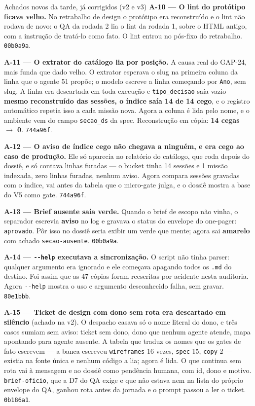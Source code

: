 \documentclass[11pt,a4paper]{article}
\newcommand{\amarelo}{\textcolor{DarkYellow}{\textbf{amarelo}}}
\newcommand{\aviso}{\textcolor{DarkYellow}{\textbf{aviso}}}
\begin{document}
\begin{sucessobox}{Achados novos da tarde, já corrigidos (v2 e v3)}
\textbf{A-10 --- O lint do protótipo ficava velho.} No retrabalho de design o protótipo era reconstruído e o lint não rodava de novo: o QA da rodada 2 lia o lint da rodada 1, sobre o HTML antigo, com a instrução de tratá-lo como fato. O lint entrou no pós-fixo do retrabalho. \texttt{00b0a9a}.

\medskip
\textbf{A-11 --- O extrator do catálogo lia por posição.} A causa real do GAP-24, mais funda que dado velho. O extrator esperava o slug na primeira coluna da linha que o agente 51 propõe; o modelo escreve a linha começando por \texttt{Ano}, sem slug. A linha era descartada em toda execução e \texttt{tipo\_decisao} saía vazio --- \textbf{mesmo reconstruído das sessões, o índice saía 14 de 14 cego}, e o registro automático repetia isso a cada missão nova. Agora a coluna é lida pelo nome, e o ambiente vem do campo \texttt{secao\_ds} da spec. Reconstrução em cópia: \textbf{14 cegas $\rightarrow$ 0}. \texttt{744a96f}.

\medskip
\textbf{A-12 --- O aviso de índice cego não chegava a ninguém, e era cego ao caso de produção.} Ele só aparecia no relatório do catálogo, que roda depois do dossiê, e só contava linhas furadas --- o bucket tinha 14 sessões e 1 missão indexada, zero linhas furadas, nenhum aviso. Agora compara sessões gravadas com o índice, vai antes da tabela que o micro-gate julga, e o dossiê mostra a base do V5 como gate. \texttt{744a96f}.

\medskip
\textbf{A-13 --- Brief ausente saía verde.} Quando o brief de escopo não vinha, o separador escrevia \aviso{} no log e gravava o status do envelope do one-pager: \texttt{aprovado}. Pôr isso no dossiê seria exibir um verde que mente; agora sai \amarelo{} com achado \texttt{secao-ausente}. \texttt{00b0a9a}.

\medskip
\textbf{A-14 --- \texttt{-{}-help} executava a sincronização.} O script não tinha parser: qualquer argumento era ignorado e ele começava apagando todos os \texttt{.md} do destino. Foi assim que as 47 cópias foram reescritas por acidente nesta auditoria. Agora \texttt{-{}-help} mostra o uso e argumento desconhecido falha, sem gravar. \texttt{80e1bbb}.

\medskip
\textbf{A-15 --- Ticket de design com dono sem rota era descartado em silêncio} (achado na v2). O despacho casava só o nome literal do dono, e três casos sumiam sem aviso: ticket sem dono, dono que nenhum agente atende, mapa apontando para agente ausente. A tabela que traduz os nomes que os gates de fato escrevem --- a banca escreveu \texttt{wireframes} 16 vezes, \texttt{spec} 15, \texttt{copy} 2 --- existia na fonte única e nenhum código a lia; agora é lida. O que continua sem rota vai à mensagem e ao dossiê como pendência humana, com id, dono e motivo. \texttt{brief-oficio}, que a D7 do QA exige e que não estava nem na lista do próprio envelope do QA, ganhou rota antes da jornada e o prompt passou a ler o ticket. \texttt{0b186a1}.


\end{sucessobox}
\end{document}
